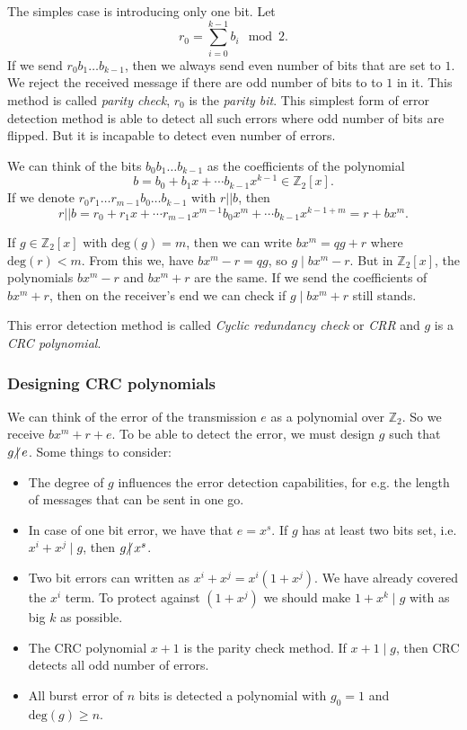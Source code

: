\documentclass{article}
\newcommand{\Z}{\mathbb{Z}}
\newcommand{\nmid}{\hspace{-4pt}\not|\hspace{2pt}}
\begin{document}
The simples case is introducing only one bit.
Let
\[
    r_0 = \sum_{i=0}^{k-1} b_i \mod 2.
\]
If we send $r_0 b_1 \ldots b_{k-1}$, then we always send even number of bits that are set to $1$.
We reject the received message if there are odd number of bits to to $1$ in it.
This method is called \emph{parity check}, $r_0$ is the \emph{parity bit}.
This simplest form of error detection method is able to detect all such errors where odd number of bits are flipped.
But it is incapable to detect even number of errors.

We can think of the bits $b_0 b_1 \dots b_{k-1}$ as the coefficients of the polynomial
\[
    b = b_0 + b_1 x + \cdots b_{k-1} x^{k-1} \in \Z_2[x].
\]
If we denote $r_0 r_1 \ldots r_{m-1} b_0 \ldots b_{k-1}$ with $r||b$, then
\[
    r||b = r_0 + r_1 x + \cdots r_{m-1} x^{m-1} b_0 x^{m} + \cdots b_{k-1} x^{k-1 + m} = r + bx^m.
\]

If $g \in \Z_2[x]$ with $\mathrm{deg}(g) = m$, then we can write $b x^m = qg + r$ where $\mathrm{deg}(r) < m$.
From this we, have $b x^m - r = qg$, so $g \mid b x^m - r$. But in $\Z_2[x]$, the polynomials $b x^m - r$ and $b x^m + r$ are the same.
If we send the coefficients of $b x^m + r$, then on the receiver's end we can check if $g \mid b x^m + r$ still stands.

This error detection method is called \emph{Cyclic redundancy check} or \emph{CRR} and $g$ is a \emph{CRC polynomial}.

\subsubsection{Designing CRC polynomials}

We can think of the error of the transmission $e$ as a polynomial over $\Z_2$.
So we receive $bx^m + r + e$. To be able to detect the error, we must design $g$ such that $g \nmid e$.
Some things to consider:
\begin{itemize}
    \item The degree of $g$ influences the error detection capabilities, for e.g. the length of messages that can be sent in one go.
    \item In case of one bit error, we have that $e=x^s$. If $g$ has at least two bits set, i.e. $x^i + x^j \mid g$, then $g \nmid x^s$.
    \item Two bit errors can written as $x^i + x^j = x^i(1 + x^j)$. We have already covered the $x^i$ term.
          To protect against $(1 + x^j)$ we should make $1 + x^k \mid g$ with as big $k$ as possible.
    \item The CRC polynomial $x+1$ is the parity check method. If $x + 1 \mid g$, then CRC detects all odd number of errors.
    \item All burst error of $n$ bits is detected a polynomial with $g_0 = 1$ and $\mathrm{deg}(g) \ge n$.
\end{itemize}
\end{document}

